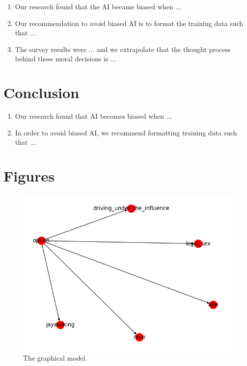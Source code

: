 \documentclass{report}
\begin{document}
\begin{enumerate}
    \item Our research found that the AI became biased when ...
    
    \item Our recommendation to avoid biased AI is to format the training data such that ...
    
    \item The survey results were ... and we extrapolate that the thought process behind these moral
    decisions is ...
\end{enumerate}

\chapter{Conclusion}

\begin{enumerate}
    \item Our research found that AI becomes biased when ...
    
    \item In order to avoid biased AI, we recommend formatting training data such that ...
\end{enumerate}




\appendix
\chapter{Figures}

\begin{figure}[h]
    \centering
    \includegraphics[scale=0.6]{figures/network.png}
    \caption[]{The graphical model.}
    \label{fig:graphical_model_image}
\end{figure}
\end{document}

